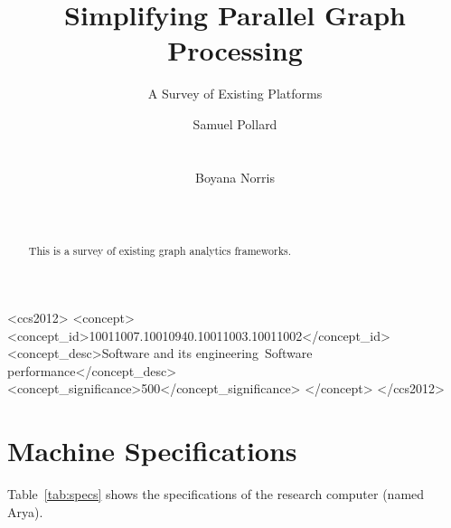 \documentclass{sig-alternate}
\begin{document}
\title{Simplifying Parallel Graph Processing}
\subtitle{A Survey of Existing Platforms}
\author{
\alignauthor
	Samuel Pollard\\
	\\
	\\
\alignauthor
	Boyana Norris\\
	\\
	\\
}
\begin{CCSXML}
	<ccs2012>
	<concept>
	<concept_id>10011007.10010940.10011003.10011002</concept_id>
	<concept_desc>Software and its engineering~Software performance</concept_desc>
	<concept_significance>500</concept_significance>
	</concept>
	</ccs2012>
\end{CCSXML}

\maketitle

\begin{abstract}
This is a survey of existing graph analytics frameworks.
\end{abstract}

\section{Machine Specifications}
Table~\ref{tab:specs} shows the specifications of the research computer (named Arya).
\end{document}
